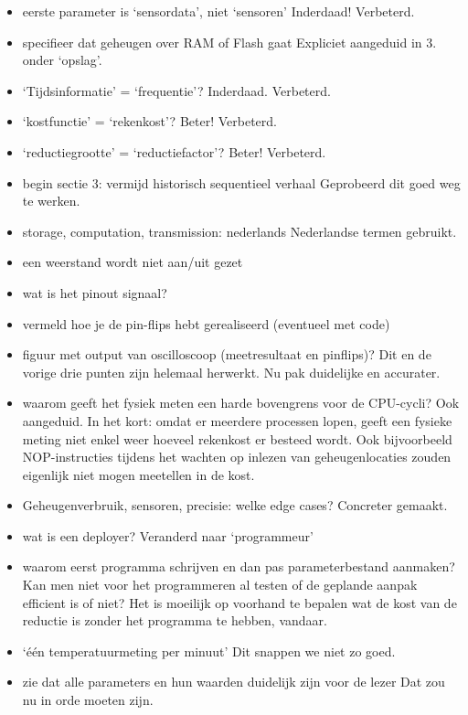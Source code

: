 \documentclass[11pt]{article}
\begin{document}
\begin{itemize}
\item eerste parameter is ‘sensordata’, niet ‘sensoren’ {\color{red} Inderdaad! Verbeterd.}
\item specifieer dat geheugen over RAM of Flash gaat {\color{red} Expliciet aangeduid in 3. onder `opslag'.}
\item ‘Tijdsinformatie’ = ‘frequentie’? {\color{red} Inderdaad. Verbeterd.}
\item ‘kostfunctie’ = ‘rekenkost’? {\color{red} Beter! Verbeterd.}
\item ‘reductiegrootte’ = ‘reductiefactor’? {\color{red} Beter! Verbeterd.}
\item begin sectie 3: vermijd historisch sequentieel verhaal {\color{red} Geprobeerd dit goed weg te werken. }
\item storage, computation, transmission: nederlands {\color{red} Nederlandse termen gebruikt.}
\item een weerstand wordt niet aan/uit gezet 
\item wat is het pinout signaal?
\item vermeld hoe je de pin-flips hebt gerealiseerd (eventueel met code)
\item figuur met output van oscilloscoop (meetresultaat en pinflips)? {\color{red} Dit en de vorige drie punten zijn helemaal herwerkt. Nu pak duidelijke en accurater.}
\item waarom geeft het fysiek meten een harde bovengrens voor de CPU-cycli? {\color{red} Ook aangeduid. In het kort: omdat er meerdere processen lopen, geeft een fysieke meting niet enkel weer hoeveel rekenkost er besteed wordt. Ook bijvoorbeeld NOP-instructies tijdens het wachten op inlezen van geheugenlocaties zouden eigenlijk niet mogen meetellen in de kost.}
\item Geheugenverbruik, sensoren, precisie: welke edge cases? {\color{red} Concreter gemaakt.}
\item wat is een deployer? {\color{red} Veranderd naar `programmeur'}
\item waarom eerst programma schrijven en dan pas parameterbestand aanmaken? Kan men niet voor het programmeren al testen of de geplande aanpak efficient is of niet? {\color{red} Het is moeilijk op voorhand te bepalen wat de kost van de reductie is zonder het programma te hebben, vandaar.}
\item ‘één temperatuurmeting per minuut’ {\color{red} Dit snappen we niet zo goed.}
\item zie dat alle parameters en hun waarden duidelijk zijn voor de lezer {\color{red} Dat zou nu in orde moeten zijn.}

\end{itemize}
\end{document}
